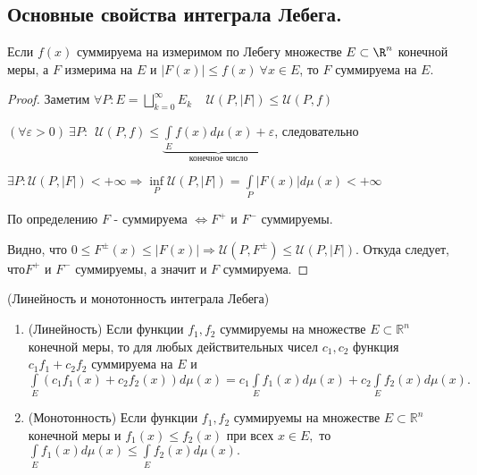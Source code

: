 \setcounter{theorem}{0}
\subsection{Основные свойства интеграла Лебега.}
\begin{lemma}
Если $f(x)$ суммируема на измеримом по Лебегу множестве $E \subset \R^n$ конечной меры, а $F$ измерима на $E$ и $|F(x)| \leqslant f(x)\ \forall x \in E$, то $F$ суммируема на $E$.
\end{lemma}
\begin{proof}
Заметим $\forall P: E = \bigsqcup\limits_{k=0}^{\infty}E_k\ \ \ \ \ \mathcal{U}(P, |F|) \leqslant \mathcal{U}(P, f)$

$(\forall \varepsilon > 0)\ \exists P: \ \  \mathcal{U}(P,f) \leqslant \underbrace{\int\limits_E f(x)d\mu(x)+\varepsilon}_{\text{конечное число}}$, следовательно

$\exists P: \mathcal{U}(P, |F|) < +\infty \Rightarrow \inf\limits_P \mathcal{U}(P, |F|) = \int\limits_P |F(x)|d\mu(x)<+\infty$

По определению $F$ - суммируема $\Leftrightarrow F^+ \text{ и } F^-$ суммируемы. 

Видно, что $0\leqslant F^\pm(x) \leqslant |F(x)| \Rightarrow \mathcal{U} (P,F^\pm) \leqslant \mathcal{U}(P,|F|)$. Откуда следует, что$ F^+$ и $ F^-$ суммируемы, а значит и $F$ суммируема.
\end{proof}


\begin{theorem}(Линейность и монотонность интеграла Лебега)
\begin{enumerate}
\item(Линейность) Если функции $ f_1,f_2 $ суммируемы на множестве $ E\subset\mathbb{R}^n $ конечной меры, то для любых действительных чисел $ c_1,c_2 $ функция $ c_1f_1+c_2f_2 $ суммируема на $ E $ и $ \int\limits_E\left( c_1f_1(x)+c_2f_2(x)\right) d\mu(x)=c_1\int\limits_Ef_1(x)d\mu(x)+c_2\int\limits_Ef_2(x)d\mu(x). $

\item(Монотонность) Если функции $ f_1,f_2 $ суммируемы на множестве $ E\subset\mathbb{R}^n $ конечной меры и $ f_1(x)\leqslant f_2(x) $ при всех $ x\in E, $ то $ \int\limits_Ef_1(x)d\mu(x)\leqslant\int\limits_Ef_2(x)d\mu(x). $
\end{enumerate}
\end{theorem}

